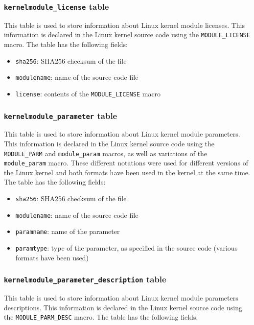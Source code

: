 \documentclass[10pt]{article}
\begin{document}
\subsubsection{\texttt{kernelmodule\_license} table}

This table is used to store information about Linux kernel module licenses.
This information is declared in the Linux kernel source code using the
\texttt{MODULE\_LICENSE} macro. The table has the following fields:

\begin{itemize}
\item \texttt{sha256}: SHA256 checksum of the file
\item \texttt{modulename}: name of the source code file
\item \texttt{license}: contents of the \texttt{MODULE\_LICENSE} macro
\end{itemize}

\subsubsection{\texttt{kernelmodule\_parameter} table}

This table is used to store information about Linux kernel module parameters.
This information is declared in the Linux kernel source code using the
\texttt{MODULE\_PARM} and \texttt{module\_param} macros, as well as variations
of the \texttt{module\_param} macro. These different notations were used for
different versions of the Linux kernel and both formats have been used in the
kernel at the same time. The table has the following fields:

\begin{itemize}
\item \texttt{sha256}: SHA256 checksum of the file
\item \texttt{modulename}: name of the source code file
\item \texttt{paramname}: name of the parameter
\item \texttt{paramtype}: type of the parameter, as specified in the source
code (various formats have been used)
\end{itemize}

\subsubsection{\texttt{kernelmodule\_parameter\_description} table}

This table is used to store information about Linux kernel module parameters
descriptions.  This information is declared in the Linux kernel source code
using the \texttt{MODULE\_PARM\_DESC} macro. The table has the following fields:
\end{document}
